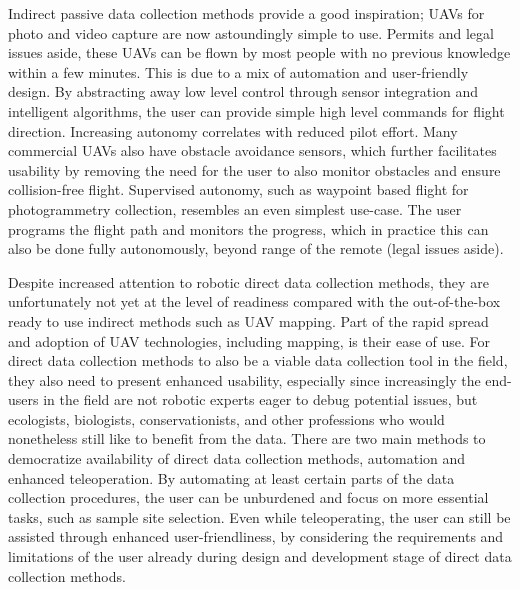 Indirect passive data collection methods provide a good inspiration; UAVs for photo and video capture are now astoundingly simple to use. Permits and legal issues aside, these UAVs can be flown by most people with no previous knowledge within a few minutes. This is due to a mix of automation and user-friendly design. By abstracting away low level control through sensor integration and intelligent algorithms, the user can provide simple high level commands for flight direction. Increasing autonomy correlates with reduced pilot effort. Many commercial UAVs also have obstacle avoidance sensors, which further facilitates usability by removing the need for the user to also monitor obstacles and ensure collision-free flight. Supervised autonomy, such as waypoint based flight for photogrammetry collection, resembles an even simplest use-case. The user programs the flight path and monitors the progress, which in practice this can also be done fully autonomously, beyond range of the remote (legal issues aside).


Despite increased attention to robotic direct data collection methods, they are unfortunately not yet at the level of readiness compared with the out-of-the-box ready to use indirect methods such as UAV mapping.
Part of the rapid spread and adoption of UAV technologies, including mapping, is their ease of use. For direct data collection methods to also be a viable data collection tool in the field, they also need to present enhanced usability, especially since increasingly the end-users in the field are not robotic experts eager to debug potential issues, but ecologists, biologists, conservationists, and other professions who would nonetheless still like to benefit from the data. There are two main methods to democratize availability of direct data collection methods, automation and enhanced teleoperation. By automating at least certain parts of the data collection procedures, the user can be unburdened and focus on more essential tasks, such as sample site selection. Even while teleoperating, the user can still be assisted through enhanced user-friendliness, by  considering the requirements and limitations of the user already during design and development stage of direct data collection methods.


